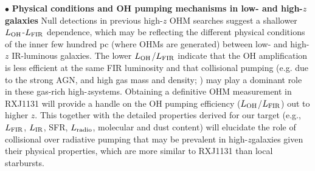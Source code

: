 \documentclass[letterpaper,11pt]{article}
\newcommand{\LIR}{\mbox{$L_{\rm IR}$}\xspace}
\newcommand{\LFIR}{\mbox{$L_{\rm FIR}$}\xspace}
\newcommand{\LOH}{$L_{\rm OH}$\xspace}
\newcommand{\ssim}{\,$\sim$\,}
\newcommand{\highz}{high-$z$\space}
\begin{document}
%
\noindent $\bullet$ {\bf Physical conditions and OH pumping mechanisms in low- and high-$z$ galaxies}
Null detections in previous high-$z$ OHM searches suggest a shallower \LOH-\LFIR dependence, which may be
reflecting the different physical conditions of the inner few hundred pc (where OHMs are generated)
between low- and high-$z$ IR-luminous galaxies.
The lower \LOH/\LFIR indicate that the OH amplification is less efficient at the same FIR luminosity
and that collisional pumping (e.g. due to the strong AGN, and high gas mass and density; \citealt{Field94a}) %
%
may play a dominant role in these gas-rich \highz systems.
Obtaining a definitive OHM measurement in RXJ1131 will provide a handle on the OH pumping efficiency (\LOH/\LFIR) out to higher $z$.
This together with the detailed properties derived for our target (e.g., \LFIR, \LIR, SFR, $L_{\rm radio}$, molecular and dust content)
will elucidate the role of collisional over radiative pumping
that may be prevalent in \highz galaxies given their physical properties, which are more similar to RXJ1131 than
local starbursts. %
\end{document}
